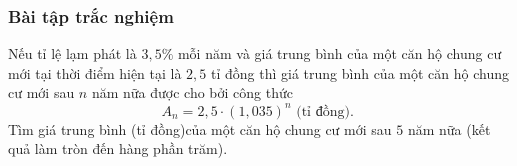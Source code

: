 \subsubsection{Bài tập trắc nghiệm}
\begin{ex}
	Nếu tỉ lệ lạm phát là $3,5 \%$ mỗi năm và giá trung bình của một căn hộ chung cư mới tại thời điểm hiện tại là $2,5$ tỉ đồng thì giá trung bình của một căn hộ chung cư mới sau $n$ năm nữa được cho bởi công thức
	$$
	A_{n}=2,5 \cdot(1,035)^{n} \text { (tỉ đồng). }
	$$
	Tìm giá trung bình (tỉ đồng)của một căn hộ chung cư mới sau $5$ năm nữa (kết quả làm tròn đến hàng phần trăm).\\
\end{ex}

